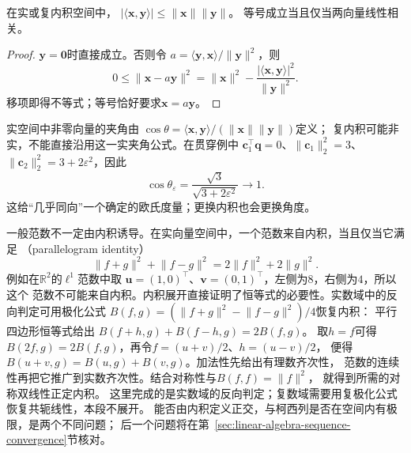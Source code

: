 \begin{theorem}
\label{thm:linear-algebra-cauchy-schwarz}
在实或复内积空间中，
$|\langle\bm x,\bm y\rangle|\leq\lVert\bm x\rVert\lVert\bm y\rVert$。
等号成立当且仅当两向量线性相关。
\end{theorem}
\begin{proof}
$\bm y=\bm0$时直接成立。否则令
$a=\langle\bm y,\bm x\rangle/\lVert\bm y\rVert^2$，则
\[
 0\leq\lVert\bm x-a\bm y\rVert^2
 =\lVert\bm x\rVert^2-
   \frac{|\langle\bm x,\bm y\rangle|^2}{\lVert\bm y\rVert^2}.
\]
移项即得不等式；等号恰好要求$\bm x=a\bm y$。
\end{proof}

实空间中非零向量的夹角由
$\cos\theta=\langle\bm x,\bm y\rangle/(\lVert\bm x\rVert\lVert\bm y\rVert)$定义；
复内积可能非实，不能直接沿用这一实夹角公式。在贯穿例中
$\bm c_1^\top\bm q=0$、$\lVert\bm c_1\rVert_2^2=3$、
$\lVert\bm c_2\rVert_2^2=3+2\varepsilon^2$，因此
\begin{equation}
 \cos\theta_\varepsilon=\frac{\sqrt3}{\sqrt{3+2\varepsilon^2}}\longrightarrow1.
 \label{eq:linear-algebra-nearly-collinear-angle}
\end{equation}
这给“几乎同向”一个确定的欧氏度量；更换内积也会更换角度。


一般范数不一定由内积诱导。在实向量空间中，一个范数来自内积，当且仅当它满足
（parallelogram identity）
\begin{equation}
  \lVert f+g\rVert^2+\lVert f-g\rVert^2
  =
  2\lVert f\rVert^2+2\lVert g\rVert^2.
  \label{eq:functional-parallelogram-identity}
\end{equation}
例如在$\mathbb{R}^2$的$\ell^1$范数中取
$\bm{u}=(1,0)^{\top}$、$\bm{v}=(0,1)^{\top}$，左侧为$8$，右侧为$4$，所以这个
范数不可能来自内积。内积展开直接证明了恒等式的必要性。实数域中的反向判定可用极化公式
$B(f,g)=(\lVert f+g\rVert^2-\lVert f-g\rVert^2)/4$恢复内积：
平行四边形恒等式给出
$B(f+h,g)+B(f-h,g)=2B(f,g)$。
取$h=f$可得$B(2f,g)=2B(f,g)$，再令$f=(u+v)/2$、$h=(u-v)/2$，
便得$B(u+v,g)=B(u,g)+B(v,g)$。加法性先给出有理数齐次性，
范数的连续性再把它推广到实数齐次性。结合对称性与$B(f,f)=\lVert f\rVert^2$，
就得到所需的对称双线性正定内积。
这里完成的是实数域的反向判定；复数域需要用复极化公式恢复共轭线性，本段不展开。
能否由内积定义正交，与柯西列是否在空间内有极限，是两个不同问题；
后一个问题将在第~\ref{sec:linear-algebra-sequence-convergence}节核对。


